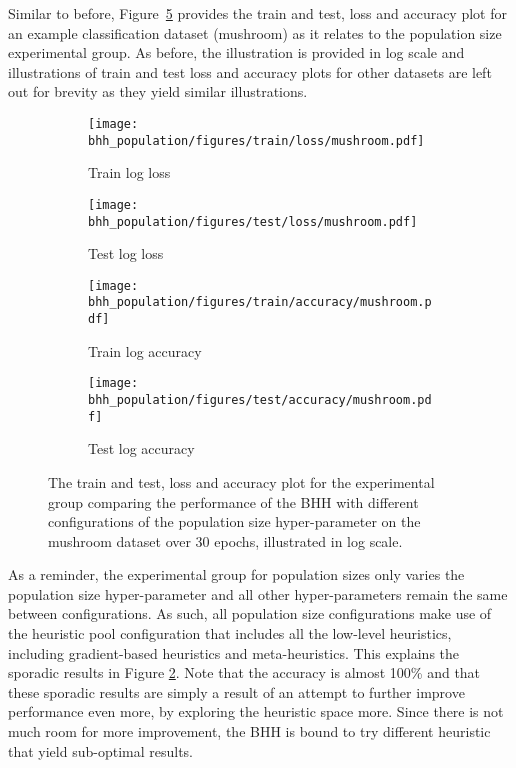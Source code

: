 Similar to before, Figure~\ref{fig:results:population:figures:mushroom} provides the train and test, loss and accuracy plot for an example classification dataset (mushroom) as it relates to the population size experimental group. As before, the illustration is provided in log scale and illustrations of train and test loss and accuracy plots for other datasets are left out for brevity as they yield similar illustrations.

\begin{figure}[htbp]
	\begin{subfigure}{0.5\textwidth}
		\centering
		\texttt{[image: bhh\_population/figures/train/loss/mushroom.pdf]}
		\caption{Train log loss}
		\label{fig:results:population:figures:loss:train:mushroom}
	\end{subfigure}
	\begin{subfigure}{0.5\textwidth}
		\centering
		\texttt{[image: bhh\_population/figures/test/loss/mushroom.pdf]}
		\caption{Test log loss}
		\label{fig:results:population:figures:loss:test:mushroom}
	\end{subfigure}
	\par\bigskip
	\begin{subfigure}{0.5\textwidth}
		\centering
		\texttt{[image: bhh\_population/figures/train/accuracy/mushroom.pdf]}
		\caption{Train log accuracy}
		\label{fig:results:population:figures:accuracy:train:mushroom}
	\end{subfigure}
	\begin{subfigure}{0.5\textwidth}
		\centering
		\texttt{[image: bhh\_population/figures/test/accuracy/mushroom.pdf]}
		\caption{Test log accuracy}
		\label{fig:results:population:figures:accuracy:test:mushroom}
	\end{subfigure}
	\par\bigskip
	\caption{The train and test, loss and accuracy plot for the experimental group comparing the performance of the \acs{BHH} with different configurations of the population size hyper-parameter on the mushroom dataset over 30 epochs, illustrated in log scale.}
	\label{fig:results:population:figures:mushroom}
\end{figure}

As a reminder, the experimental group for population sizes only varies the population size hyper-parameter and all other hyper-parameters remain the same between configurations. As such, all population size configurations make use of the heuristic pool configuration that includes all the low-level heuristics, including gradient-based heuristics and meta-heuristics. This explains the sporadic results in Figure \ref{fig:results:population:figures:loss:test:mushroom}. Note that the accuracy is almost 100\% and that these sporadic results are simply a result of an attempt to further improve performance even more, by exploring the heuristic space more. Since there is not much room for more improvement, the \acs{BHH} is bound to try different heuristic that yield sub-optimal results.

